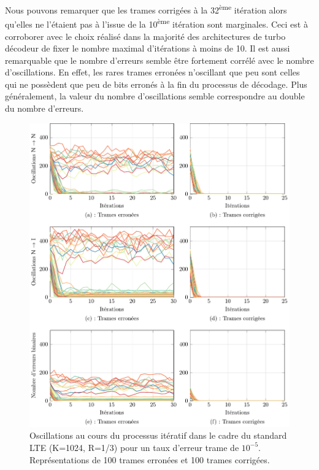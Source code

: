 Nous pouvons remarquer que les trames corrigées à la 32\textsuperscript{ème} itération alors qu'elles ne l'étaient pas à 
l'issue de la 10\textsuperscript{ème} itération sont marginales. Ceci est à corroborer avec le choix réalisé dans la majorité des 
architectures de turbo décodeur de fixer le nombre maximal d'itérations à moins de 10.
Il est aussi remarquable que le nombre d'erreurs semble être fortement corrélé avec le nombre d'oscillations. En effet, 
les rares trames erronées n'oscillant que peu sont celles qui ne possèdent que peu de bits erronés à la fin du processus
de décodage. Plus généralement,
la valeur du nombre d'oscillations semble correspondre au double du nombre d'erreurs.

\begin{figure}[!ht]
	\begin{center}
	\includegraphics[width=.9\textwidth]{main/ch2_fig/tikz/it_lte10-5.pdf}
	\caption{Oscillations au cours du processus itératif dans le cadre du standard LTE (K=1024, R=1/3) pour un taux 
	d'erreur trame de $10^{-5}$. Représentations de 100 trames erronées et 100 trames corrigées.
	\label{ch2:fig:it_lte_2}}
	\end{center}
\end{figure}

